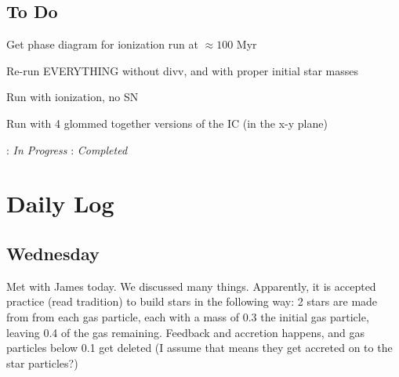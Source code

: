 \documentclass[11pt,letterpaper]{article}
\begin{document}
\subsection*{To Do}
\begin{bullets}
\item Get phase diagram for ionization run at $\approx 100$ Myr
\item \textleaf Re-run EVERYTHING without divv, and with proper initial star masses
\item \textleaf Run with ionization, no SN
\item Run with 4 glommed together versions of the IC (in the x-y plane)
\end{bullets}

\textleaf : \textit{In Progress} \qquad \checkmark : \textit{Completed}

\section*{Daily Log}
\subsection*{Wednesday}
Met with James today.  We discussed many things.  Apparently, it is accepted 
practice (read tradition) to build stars in the following way:  2 stars are 
made from from each gas particle, each with a mass of 0.3 the initial gas 
particle, leaving 0.4 of the gas remaining.  Feedback and accretion happens, 
and gas particles below 0.1 get deleted (I assume that means they get accreted
on to the star particles?)
\end{document}
